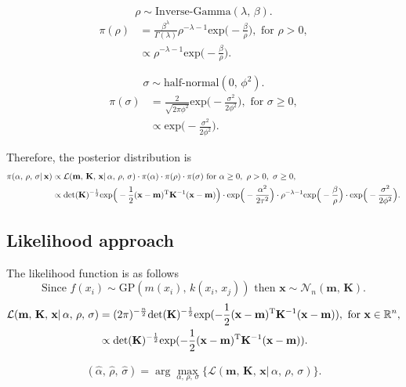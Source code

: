       \[\rho \sim \text{Inverse-Gamma}(\lambda, \, \beta).\]
      \begin{align*}
         \pi(\rho)
         & = \frac{\beta^{\lambda}}{\Gamma(\lambda)} \rho^{-\lambda-1} \text{exp} \Big(-\frac{\beta}{\rho} \Big), \text{ for } \rho > 0,\\
         & \propto \rho^{-\lambda-1} \text{exp} \Big(-\frac{\beta}{\rho} \Big).
      \end{align*}

      \[\sigma \sim \text{half-normal} (0, \, \phi^2).\]
      \begin{align*}
         \pi(\sigma)
         & = \frac{2}{\sqrt{2\pi\phi^2}} \text{exp} \Big(-\frac{\sigma^2}{2\phi^2} \Big), \text{ for } \sigma \geq 0,\\
         & \propto \text{exp} \Big(-\frac{\sigma^2}{2\phi^2} \Big).
      \end{align*}

      Therefore, the posterior distribution is
      \begin{align*}
         \pi(\alpha,\, \rho,\, \sigma| \, \mathbf{x}) 
         & \propto \mathcal{L}(\mathbf{m},\, \mathbf{K},\, \mathbf{x}| \, \alpha,\, \rho,\, \sigma) 
         \cdot \pi(\alpha) 
         \cdot \pi(\rho) 
         \cdot \pi(\sigma)
         \text{ for } \alpha \geq 0,\ \rho > 0,\ \sigma \geq 0,\\
         & \propto \text{det}(\mathbf{K})^{-\frac{1}{2}} 
         \text{exp} \Big(-\frac{1}{2} (\mathbf{x} - \mathbf{m})^{\text{\text{T}}} \mathbf{K}^{-1} (\mathbf{x} - \mathbf{m}) \Big)
         \cdot \text{exp} \Big(-\frac{\alpha^2}{2\tau^2} \Big) 
         \cdot \rho^{-\lambda-1} \text{exp} \Big(-\frac{\beta}{\rho} \Big) 
         \cdot \text{exp} \Big(-\frac{\sigma^2}{2\phi^2} \Big).
      \end{align*}

   \subsection{Likelihood approach}

      The likelihood function is as follows
      \[\text{Since } f(x_{i}) \sim \text{GP}(m(x_{i}) ,\, k(x_{i},\, x_{j})) \text{ then } \mathbf{x} \sim \mathcal{N}_{n}(\mathbf{m} ,\, \mathbf{K}).\]
      \begin{align*}
         \mathcal{L}(\mathbf{m} ,\, \mathbf{K} ,\, \mathbf{x}| \, \alpha ,\, \rho ,\, \sigma)
         & = (2\pi)^{-\frac{n}{2}}\text{det}(\mathbf{K})^{-\frac{1}{2}} 
         \text{exp} (-\frac{1}{2} (\mathbf{x} - \mathbf{m})^{\text{\text{T}}} \mathbf{K}^{-1} (\mathbf{x} - \mathbf{m})),
         \text{ for } \mathbf{x} \in \mathbb{R}^{n},\\
         & \propto \text{det}(\mathbf{K})^{-\frac{1}{2}} 
         \text{exp} (-\frac{1}{2} (\mathbf{x} - \mathbf{m})^{\text{\text{T}}} \mathbf{K}^{-1} (\mathbf{x} - \mathbf{m})).
      \end{align*}

      \begin{align*}
         (\hat{\alpha} ,\, \hat{\rho} ,\, \hat{\sigma}) = \arg\max_{\alpha ,\, \rho ,\, \sigma} \{\mathcal{L}(\mathbf{m} ,\, \mathbf{K} ,\, \mathbf{x}| \, \alpha ,\, \rho ,\, \sigma)\}.
      \end{align*}
